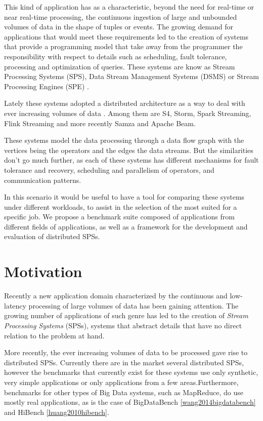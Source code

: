 \documentclass[ppgc,diss,english]{iiufrgs}
\begin{document}
This kind of application has as a characteristic, beyond the need for real-time or near real-time processing, the continuous ingestion of large and unbounded volumes of data in the shape of tuples or events. The growing demand for applications that would meet these requirements led to the creation of systems that provide a programming model that take away from the programmer the responsibility with respect to details such as scheduling, fault tolerance, processing and optimization of queries. These systems are know as Stream Processing Systems (SPS), Data Stream Management Systems (DSMS) \cite{chakravarthy2009stream} or Stream Processing Engines (SPE) \cite{abadi2005design}.

Lately these systems adopted a distributed architecture as a way to deal with ever increasing volumes of data \cite{zaharia2012discretized}. Among them are S4, Storm, Spark Streaming, Flink Streaming and more recently Samza and Apache Beam.

These systems model the data processing through a data flow graph with the vertices being the operators and the edges the data streams. But the similarities don't go much further, as each of these systems has different mechanisms for fault tolerance and recovery, scheduling and parallelism of operators, and communication patterns.

In this scenario it would be useful to have a tool for comparing these systems under different workloads, to assist in the selection of the most suited for a specific job. We propose a benchmark suite composed of applications from different fields of applications, as well as a framework for the development and evaluation of distributed SPSs.

\section{Motivation}

Recently a new application domain characterized by the continuous and low-latency processing of large volumes of data has been gaining attention. The growing number of applications of such genre has led to the creation of \emph{Stream Processing Systems} (SPSs), systems that abstract details that have no direct relation to the problem at hand.

More recently, the ever increasing volumes of data to be processed gave rise to distributed SPSs. Currently there are in the market several distributed SPSs, however the benchmarks that currently exist for these systems use only synthetic, very simple applications or only applications from a few areas.Furthermore, benchmarks for other types of Big Data systems, such as MapReduce, do use mostly real applications, as is the case of BigDataBench \ref{wang2014bigdatabench} and HiBench \ref{huang2010hibench}.
\end{document}
